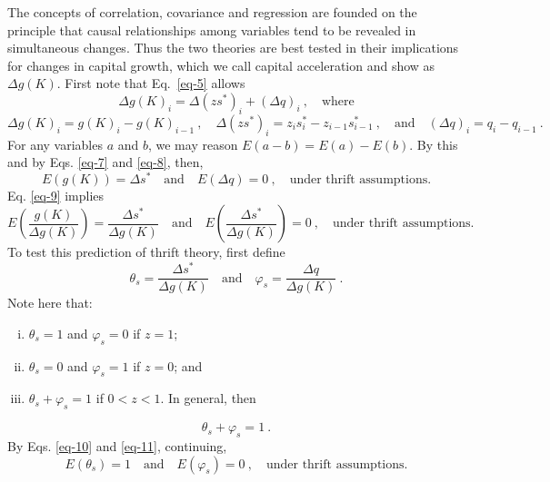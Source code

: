 \documentclass[a4paper,fleqn]{latex_styles/cas-sc}
\begin{document}
The concepts of correlation, covariance and regression are founded on the principle that causal relationships among variables tend to be revealed in simultaneous changes. Thus the two theories are best tested in their
implications for changes in capital growth, which we call capital acceleration and show as $\Delta g(K)$. First note that Eq.~\eqref{eq-5} allows
%
\begin{equation}
    \Delta g (K)_{i} = \Delta(z s^*)_{i} + (\Delta q)_{i}\ , \quad \text{where}\label{eq-8}
\end{equation}
%
\[\Delta g(K)_{i} = g(K)_{i} - g(K)_{i - 1} \ , \quad
     \Delta (z s^{*})_{i} = z_i s^{*}_{i} - z_{i-1} s^{*}_{i - 1} \ , \quad \text{and} \quad
(\Delta q)_{i} = q_{i} - q_{i - 1} \ .\]
%
For any variables \(a\) and \(b\), we may reason
\(E(a - b) = E(a) - E(b)\). By this and by Eqs. \eqref{eq-7} and
\eqref{eq-8}, then,
%
\begin{equation}
    E(g(K)) = \Delta s^* \quad \text{and} \quad E(\Delta q) = 0\ , \quad \text{under thrift assumptions.}\label{eq-9}
\end{equation}
%
Eq. \eqref{eq-9} implies
\begin{equation}
    E \left(\frac{g(K)}{\Delta g(K)} \right) = \frac{\Delta s^*}{\Delta g(K)} \quad \text{and} \quad E \left(\frac{\Delta s^*}{\Delta g(K)} \right) = 0\ , \quad \text{under thrift assumptions.} \label{eq-10}
\end{equation}
%
To test this prediction of thrift theory, first define
\begin{equation}
    \theta_s = \frac{\Delta s^*}{\Delta g (K)} \quad \text{and} \quad \varphi_s = \frac{\Delta q}{\Delta g (K)}\ . \label{eq-11}
\end{equation}
%
Note here that:
\begin{enumerate}[i)]
\item \(\theta_s = 1\) and \(\varphi_s = 0\) if  \(z = 1\); 
\item \(\theta_s = 0\) and \(\varphi_s = 1\) if  \(z = 0\); and
\item \(\theta_s + \varphi_s = 1\) \hspace{2.3em} if \(0<z<1\). In general, then
\end{enumerate}
%
\begin{equation}
    \theta_s + \varphi_s = 1\ . \label{eq-12}
\end{equation}
%
By Eqs. \eqref{eq-10} and \eqref{eq-11}, continuing, 
%
\begin{equation}
    E(\theta_s) = 1 \quad \text{and} \quad E(\varphi_s) = 0 \ , \quad \text{under thrift assumptions.} \label{eq-12a}
\end{equation}
\end{document}
